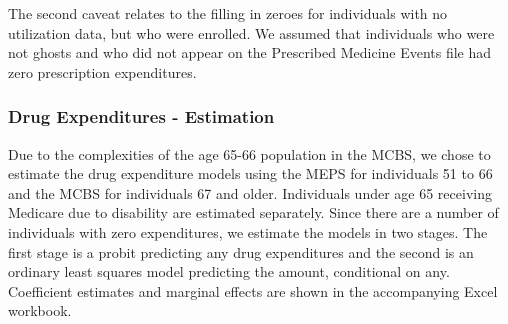 The second caveat relates to the filling in zeroes for individuals with no utilization data, but who were enrolled.  We assumed that
individuals who were not ghosts and who did not appear on the Prescribed Medicine Events file had zero prescription expenditures.  
  

\subsubsection{Drug Expenditures - Estimation}
\label{sec:model_development_rxexp_estimation}
Due to the complexities of the age 65-66 population in the MCBS, we chose to estimate the drug expenditure models using the MEPS for 
individuals 51 to 66 and the MCBS for individuals 67 and older.  Individuals under age 65 receiving Medicare due to disability are 
estimated separately.  Since there are a number of individuals with zero expenditures, we estimate the models in two stages.  The 
first stage is a probit predicting any drug expenditures and the second is an ordinary least squares model predicting the amount, 
conditional on any.  Coefficient estimates and marginal effects are shown in the accompanying Excel workbook.

